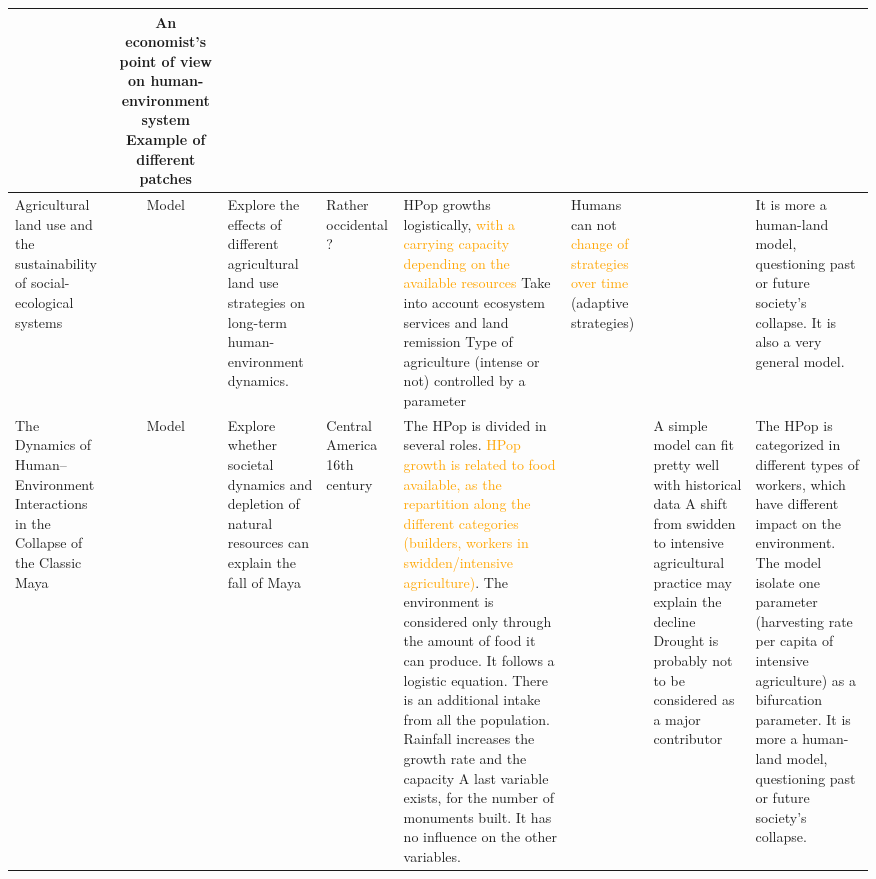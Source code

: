 \documentclass[landscape, a3paper]{article}
\newcommand{\Hlight}[1]{\textcolor{orange}{#1}}
\begin{document}
\begin{longtable}{p{4cm}|c|p{5cm}|p{3cm}|p{5cm}|p{5cm}|p{8cm}|p{5cm}|}
& An economist's point of view on human-environment system \newline
Example of different patches


\\ \hline \hline

Agricultural land use and the sustainability of social-ecological systems \cite{bengochea_paz_agricultural_2020}
& Model 
& Explore the effects of different agricultural land use strategies on long-term human-environment dynamics. 
& Rather occidental ? 
& HPop growths logistically, \Hlight{with a carrying capacity depending on the available resources} \newline
Take into account ecosystem services and land remission \newline
Type of agriculture (intense or not) controlled by a parameter
& Humans can not \Hlight{change of strategies over time} (adaptive strategies)
&
& It is more a human-land model, questioning past or future society's collapse. It is also a very general model.
\\ \hline

The Dynamics of Human–Environment Interactions in the Collapse of the  Classic Maya \cite{roman_dynamics_2018}
& Model
& Explore whether societal dynamics and depletion of natural resources can explain the fall of Maya
& Central America 16th century
& The HPop is divided in several roles. \Hlight{HPop growth is related to food available, as the repartition along the different categories (builders, workers in swidden/intensive agriculture)}. \newline
The environment is considered only through the amount of food it can produce. It follows a logistic equation. There is an additional intake from all the population. Rainfall increases the growth rate and the capacity\newline
A last variable exists, for the number of monuments built. It has no influence on the other variables.
& 
& A simple model can fit pretty well with historical data \newline
A shift from swidden to intensive agricultural practice may explain the decline \newline
Drought is probably not to be considered as a major contributor
& The HPop is categorized in different types of workers, which have different impact on the environment. 
\newline
The model isolate one parameter (harvesting rate per capita of intensive agriculture) as a bifurcation parameter. \newline
It is more a human-land model, questioning past or future society's collapse.
\\ \hline

\end{longtable}




\newpage



\end{document}
